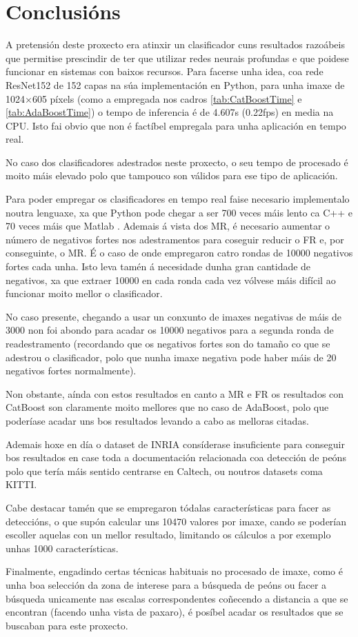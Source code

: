 \documentclass[galician]{./head/uvigo-tfg}
\begin{document}
    \section{Conclusións}
    \par A pretensión deste proxecto era atinxir un clasificador cuns resultados razoábeis que permitise prescindir de ter que utilizar redes neurais profundas e que poidese funcionar en sistemas con baixos recursos. Para facerse unha idea, coa rede ResNet152\cite{he2016deep} de 152 capas na súa implementación en Python, para unha imaxe de 1024$\times$605 píxels (como a empregada nos cadros \ref{tab:CatBoostTime} e \ref{tab:AdaBoostTime}) o tempo de inferencia é de 4.607s (0.22fps) en media na CPU. Isto fai obvio que non é factíbel empregala para unha aplicación en tempo real.
    \par No caso dos clasificadores adestrados neste proxecto, o seu tempo de procesado é moito máis elevado polo que tampouco son válidos para ese tipo de aplicación.
    \par Para poder empregar os clasificadores en tempo real faise necesario implementalo noutra lenguaxe,  xa que Python pode chegar a ser 700 veces máis lento ca C++ e 70 veces máis que Matlab \cite{python}. Ademais á vista dos MR, é necesario aumentar o número de negativos fortes nos adestramentos para coseguir reducir o FR e, por conseguinte, o MR. É o caso de \cite{filtered} onde empregaron catro rondas de 10000 negativos fortes cada unha. Isto leva tamén á necesidade dunha gran cantidade de negativos, xa que extraer 10000 en cada ronda cada vez vólvese máis difícil ao funcionar moito mellor o clasificador.
    \par No caso presente, chegando a usar un conxunto de imaxes negativas de máis de 3000 non foi abondo para acadar os 10000 negativos para a segunda ronda de readestramento (recordando que os negativos fortes son do tamaño co que se adestrou o clasificador, polo que nunha imaxe negativa pode haber máis de 20 negativos fortes normalmente).
    \par Non obstante, aínda con estos resultados en canto a MR e FR os resultados con CatBoost son claramente moito mellores que no caso de AdaBoost, polo que poderíase acadar uns bos resultados levando a cabo as melloras citadas. 
    \par Ademais hoxe en día o dataset de INRIA consíderase insuficiente para conseguir bos resultados en case toda a documentación relacionada coa detección de peóns polo que tería máis sentido centrarse en Caltech, ou noutros datasets coma KITTI\cite{kitti}.
    \par Cabe destacar tamén que se empregaron tódalas características para facer as deteccións, o que supón calcular uns 10470 valores por imaxe, cando se poderían escoller aquelas con un mellor resultado, limitando os cálculos a por exemplo unhas 1000 características.
    \par Finalmente, engadindo certas técnicas habituais no procesado de imaxe, como é unha boa selección da zona de interese para a búsqueda de peóns ou facer a búsqueda unicamente nas escalas correspondentes coñecendo a distancia a que se encontran (facendo unha vista de paxaro), é posíbel acadar os resultados que se buscaban para este proxecto.
    
\end{document}
